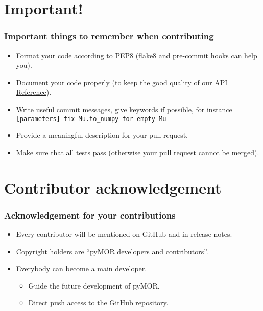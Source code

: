 \documentclass[%
]{beamer}
\begin{document}
\section{Important!}
\begin{frame}[fragile]
	\frametitle{Important things to remember when contributing}

	\begin{itemize}
		\item Format your code according to \href{https://www.python.org/dev/peps/pep-0008/}{PEP8} (\href{https://flake8.pycqa.org/en/latest/}{flake8} and \href{https://pre-commit.com/}{pre-commit} hooks can help you).
		\item Document your code properly (to keep the good quality of our \href{https://docs.pymor.org/latest/autoapi/index.html}{API Reference}).
		\item Write useful commit messages, give keywords if possible, for instance \texttt{[parameters] fix Mu.to_numpy for empty Mu}
		\item Provide a meaningful description for your pull request.
		\item Make sure that all tests pass (otherwise your pull request cannot be merged).
	\end{itemize}
\end{frame}
\section{Contributor acknowledgement}
\begin{frame}[fragile]
	\frametitle{Acknowledgement for your contributions}

	\begin{itemize}
		\item Every contributor will be mentioned on GitHub and in release notes.
		\item Copyright holders are ``pyMOR developers and contributors''.
		\item Everybody can become a main developer.
		\begin{itemize}
			\item Guide the future development of pyMOR.
			\item Direct push access to the GitHub repository.
		\end{itemize}
	\end{itemize}
\end{frame}
\end{document}
